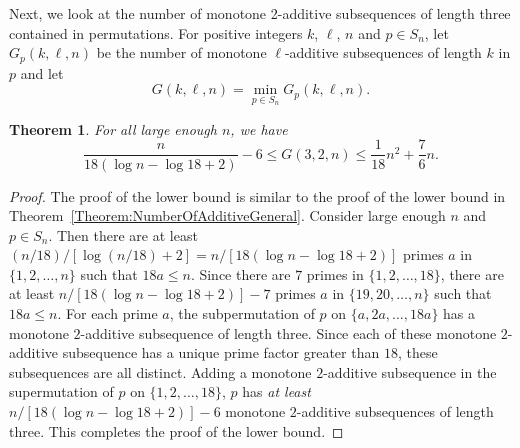 \documentclass[11pt]{article}
\newtheorem{theorem}{Theorem}[section]
\theoremstyle{definition}
\begin{document}
Next, we look at the number of monotone 2-additive subsequences of length three contained in permutations. For positive integers $k$, $\ell$, $n$ and $p\in S_n$, let $G_p(k,\ell,n)$ be the number of monotone $\ell$-additive subsequences of length $k$ in $p$ and let 
\[
G(k,\ell,n)=\min_{p\in S_n}G_p(k,\ell,n).
\]
\begin{theorem}
For all large enough $n$, we have
    \[
    \frac{n}{18(\log n-\log18+2)}-6\leq G(3,2,n)\leq\frac{1}{18}n^2+\frac{7}{6}n.
    \]
\end{theorem}
\begin{proof}
The proof of the lower bound is similar to the proof of the lower bound in Theorem~\ref{Theorem:NumberOfAdditiveGeneral}. Consider large enough $n$ and $p\in S_n$. Then there are at least $(n/18)/[\log(n/18)+2]=n/[18(\log n-\log18+2)]$ primes $a$ in $\{1,2,\ldots,n\}$ such that $18a\leq n$. Since there are $7$ primes in $\{1,2,\ldots,18\}$, there are at least $
n/[18(\log n-\log18+2)]-7
$
primes $a$ in $\{19,20,\ldots,n\}$ such that $18a\leq n$. For each prime $a$, the subpermutation of $p$ on $\{a,2a,\ldots,18a\}$ has a monotone $2$-additive subsequence of length three. Since each of these monotone $2$-additive subsequence has a unique prime factor greater than $18$, these subsequences are all distinct. Adding a monotone $2$-additive subsequence in the supermutation of $p$ on $\{1,2,\ldots,18\}$, $p$ has \textit{at least} $
n/[18(\log n-\log18+2)]-6
$ monotone $2$-additive subsequences of length three. This completes the proof of the lower bound.


\end{proof}
\end{document}
